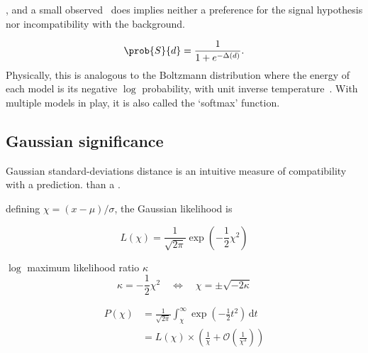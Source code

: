 , and a small observed \pvalue\ does implies neither
a preference for the signal hypothesis nor incompatibility with the background.




\begin{equation}
\label{eqn:searches_logistic}
\prob{S}{d} = \frac{1}{1 + e^{-\Delta(d)}}
.
\end{equation}
Physically, this is analogous to the Boltzmann distribution where the energy
of each model is its negative $\log$ probability, with unit inverse
temperature~\cite{
skilling2017david,
lecun-06,
pmlr-v2-ranzato07a
}.
With multiple models in play, it is also called the `softmax'
function.




\subsection{Gaussian significance}
Gaussian standard-deviations distance is an intuitive measure of compatibility
with a prediction.
than
a \pvalue.

defining $\chi = (x - \mu) / \sigma$, the Gaussian likelihood is

\begin{equation}
L(\chi) =
\frac{1}{\sqrt{2\pi}}
\exp\!\left(-\frac{1}{2}\chi^2\right)
\end{equation}


$\log$ maximum likelihood ratio $\kappa$
\begin{equation}
\kappa = -\frac{1}{2}\chi^2
\quad
\Leftrightarrow
\quad
\chi = \pm\sqrt{-2\kappa}
\end{equation}



\begin{align}
P(\chi)
&=
\frac{1}{\sqrt{2\pi}}
\int_\chi^\infty
\!
\exp\!\left(-\frac{1}{2}t^2\right)
\,\mathrm{d}t
\\[0.5em]
&=
L(\chi)
\times
\left(
\frac{1}{\chi}
+
\mathcal{O}\!\left(\frac{1}{\chi^3}\right)
\right)
\end{align}
~\cite{
jaynes2003probability,
abramowitz1965handbook
}

